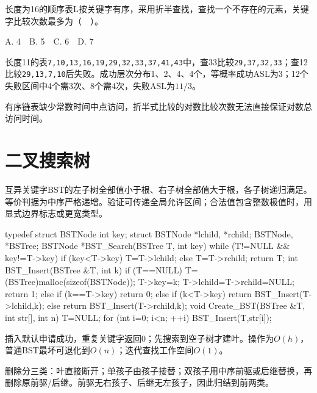 长度为16的顺序表L按关键字有序，采用折半查找，查找一个不存在的元素，关键字比较次数最多为（　）。

A. 4　B. 5　C. 6　D. 7

长度11的表\texttt{7,\allowbreak{}10,\allowbreak{}13,\allowbreak{}16,\allowbreak{}19,\allowbreak{}29,\allowbreak{}32,\allowbreak{}33,\allowbreak{}37,\allowbreak{}41,\allowbreak{}43}中，查33比较\texttt{29,\allowbreak{}37,\allowbreak{}32,\allowbreak{}33}；查12比较\texttt{29,\allowbreak{}13,\allowbreak{}7,\allowbreak{}10}后失败。成功层次分布1、2、4、4个，等概率成功ASL为3；12个失败区间中4个需3次、8个需4次，失败ASL为\(11/3\)。

有序链表缺少常数时间中点访问，折半式比较的对数比较次数无法直接保证对数总访问时间。

\section{二叉搜索树}\label{DS07-bst}

互异关键字BST的左子树全部值小于根、右子树全部值大于根，各子树递归满足。等价判据为中序严格递增。验证可传递全局允许区间；合法值包含整数极值时，用显式边界标志或更宽类型。

\par\smallskip\noindent\begin{minipage}{\linewidth}
\begin{codeblock}[language={C++}]
typedef struct BSTNode {
    int key;
    struct BSTNode *lchild, *rchild;
} BSTNode, *BSTree;
BSTNode *BST_Search(BSTree T, int key) {
    while (T!=NULL && key!=T->key) {
        if (key<T->key) T=T->lchild;
        else T=T->rchild;
    }
    return T;
}
int BST_Insert(BSTree &T, int k) {
    if (T==NULL) {
        T=(BSTree)malloc(sizeof(BSTNode));
        T->key=k;
        T->lchild=T->rchild=NULL;
        return 1;
    } else if (k==T->key) return 0;
    else if (k<T->key) return BST_Insert(T->lchild,k);
    else return BST_Insert(T->rchild,k);
}
void Create_BST(BSTree &T, int str[], int n) {
    T=NULL;
    for (int i=0; i<n; ++i) BST_Insert(T,str[i]);
}
\end{codeblock}
\end{minipage}\par\smallskip

插入默认申请成功，重复关键字返回0；先搜索到空子树才建叶。操作为\(O(h)\)，普通BST最坏可退化到\(O(n)\)；迭代查找工作空间\(O(1)\)。

删除分三类：叶直接断开；单孩子由孩子接替；双孩子用中序前驱或后继替换，再删除原前驱/后继。前驱无右孩子、后继无左孩子，因此归结到前两类。


